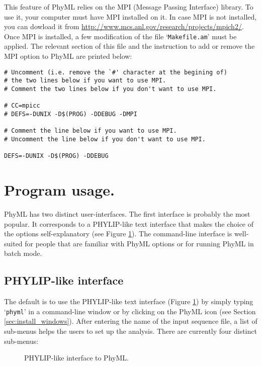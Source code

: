 \documentclass[a4paper,12pt]{article}
\newcommand{\x}[1]{\texttt{#1}}
\begin{document}
This  feature of  PhyML relies  on the  MPI (Message  Passing Interface)  library. To  use  it, your
computer must  have MPI  installed on  it. In case  MPI is  not installed, you  can dowload  it from
\href{http://www.mcs.anl.gov/research/projects/mpich2/}{http://www.mcs.anl.gov/research/projects/mpich2/}.
Once  MPI is  installed, a  few modification  of the  file `\x{Makefile.am}'  must be  applied.  The
relevant section  of this file  and the  instruction to add  or remove the  MPI option to  PhyML are
printed below:

\begin{verbatim}
# Uncomment (i.e. remove the `#' character at the begining of) 
# the two lines below if you want to use MPI.
# Comment the two lines below if you don't want to use MPI.

# CC=mpicc
# DEFS=-DUNIX -D$(PROG) -DDEBUG -DMPI

# Comment the line below if you want to use MPI.
# Uncomment the line below if you don't want to use MPI.

DEFS=-DUNIX -D$(PROG) -DDEBUG
\end{verbatim}


\section{Program usage.}\label{sec:phyml_new}

PhyML  has two distinct  user-interfaces.  The  first interface  is probably  the most  popular.  It
corresponds to  a PHYLIP-like text interface that  makes the choice of  the options self-explanatory
(see  Figure \ref{fig:interface}). The  command-line interface  is well-suited  for people  that are
familiar with PhyML options or for running PhyML in batch mode.

\subsection{PHYLIP-like interface}

The default is  to use the PHYLIP-like text interface (Figure  \ref{fig:interface}) by simply typing
`\x{phyml}'  in   a  command-line   window  or  by   clicking  on   the  PhyML  icon   (see  Section
\ref{sec:install_windows}).  After entering the name of the input sequence file, a list of sub-menus
helps the users to set up the analysis.  There are currently four distinct sub-menus:

\begin{figure}
\caption{PHYLIP-like interface to PhyML.}
\label{fig:interface}
\end{figure}
\end{document}
